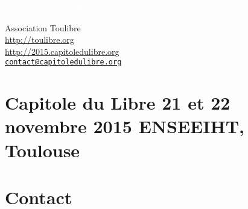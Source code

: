 \documentclass{cdl_sponsor}
\begin{document}
\renewcommand{\tablename}{\bsc{Tableau}}

\thispagestyle{empty} %



\parbox[t]{1.0\textwidth}{
	\flushright \fontsize{44pt}{66pt}\selectfont %
	\vspace*{0.7cm} %

	\textcolor{white}{
		\hfill \textsc{Capitole du Libre 2015} \\
		\fontsize{36pt}{54pt}\selectfont{
      \hfill 21 et 22 novembre 2015 \\
    }
		\fontsize{24pt}{36pt}
	}
	\par

	\vspace*{0.7cm} %
}




\vfill %

{\centering \large
\hfill Association Toulibre \\
\hfill \url{http://toulibre.org} \\
\hfill \url{http://2015.capitoledulibre.org} \\
\hfill \href{mailto:contact@capitoledulibre.org}{\texttt{contact@capitoledulibre.org}} \\
}
\clearpage


\section{Capitole du Libre {\small \textthreequartersemdash \/ 21 et 22 novembre 2015 \textthreequartersemdash \/ ENSEEIHT, Toulouse}}

	



\section{Contact}

	
\end{document}
